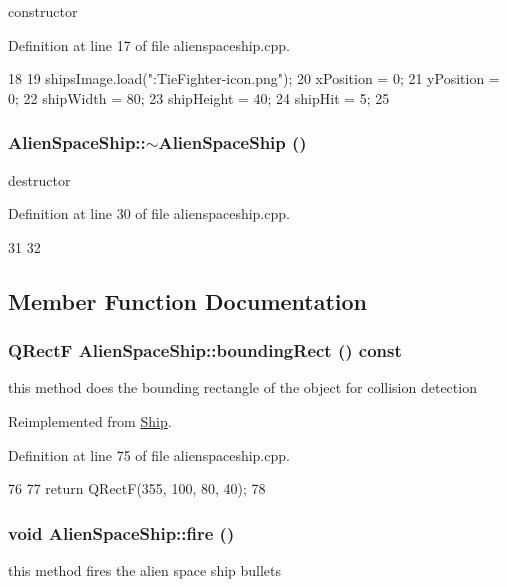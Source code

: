constructor 

Definition at line 17 of file alienspaceship.cpp.


\begin{DoxyCode}
18 {
19     shipsImage.load(":TieFighter-icon.png");
20     xPosition = 0;
21     yPosition = 0;
22     shipWidth = 80;
23     shipHeight = 40;
24     shipHit = 5;
25 }
\end{DoxyCode}
\hypertarget{class_alien_space_ship_a4d3f300898239370f3daa688aa16f801}{
\subsubsection[{$\sim$AlienSpaceShip}]{\setlength{\rightskip}{0pt plus 5cm}AlienSpaceShip::$\sim$AlienSpaceShip ()}}
\label{class_alien_space_ship_a4d3f300898239370f3daa688aa16f801}
destructor 

Definition at line 30 of file alienspaceship.cpp.


\begin{DoxyCode}
31 {
32 }
\end{DoxyCode}


\subsection{Member Function Documentation}
\hypertarget{class_alien_space_ship_ab99ad296ecc69ab1b84bf692eaeb775e}{
\subsubsection[{boundingRect}]{\setlength{\rightskip}{0pt plus 5cm}QRectF AlienSpaceShip::boundingRect () const}}
\label{class_alien_space_ship_ab99ad296ecc69ab1b84bf692eaeb775e}
this method does the bounding rectangle of the object for collision detection 

Reimplemented from \hyperlink{class_ship_a40856df827844b4045eb97345f401995}{Ship}.

Definition at line 75 of file alienspaceship.cpp.


\begin{DoxyCode}
76 {
77     return QRectF(355, 100, 80, 40);
78 }
\end{DoxyCode}
\hypertarget{class_alien_space_ship_a311238821e190e2198cfed6cc956e4c8}{
\subsubsection[{fire}]{\setlength{\rightskip}{0pt plus 5cm}void AlienSpaceShip::fire ()}}
\label{class_alien_space_ship_a311238821e190e2198cfed6cc956e4c8}
this method fires the alien space ship bullets 

